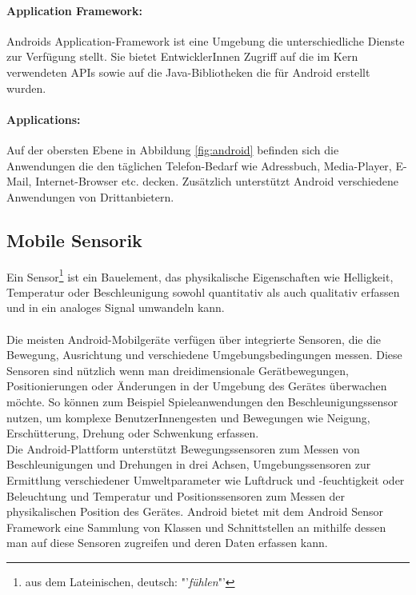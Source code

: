 \paragraph{Application Framework: }
Androids Application-Framework ist eine Umgebung die unterschiedliche Dienste zur Verfügung stellt. Sie bietet EntwicklerInnen Zugriff auf die im Kern verwendeten \glspl{API} sowie auf die Java-Bibliotheken die für Android erstellt wurden. 
\paragraph{Applications: }
Auf der obersten Ebene in Abbildung \ref{fig:android} befinden sich die Anwendungen die den täglichen Telefon-Bedarf wie Adressbuch, Media-Player, E-Mail, Internet-Browser etc. decken. Zusätzlich unterstützt Android verschiedene Anwendungen von Drittanbietern.
%
%
\subsection{Mobile Sensorik} 
Ein Sensor\footnote{ aus dem Lateinischen, deutsch: "'\textit{fühlen}"'} ist ein Bauelement, das physikalische Eigenschaften wie Helligkeit, Temperatur oder Beschleunigung sowohl quantitativ als auch qualitativ erfassen und in ein analoges Signal umwandeln kann. \cite{sensor} \\\\
Die meisten Android-Mobilgeräte verfügen über integrierte Sensoren, die die Bewegung, Ausrichtung und verschiedene Umgebungsbedingungen messen. Diese Sensoren sind nützlich wenn man dreidimensionale Gerätbewegungen, Positionierungen oder Änderungen in der Umgebung des Gerätes überwachen möchte. So können zum Beispiel Spieleanwendungen den Beschleunigungssensor nutzen, um komplexe BenutzerInnengesten und Bewegungen wie Neigung, Erschütterung, Drehung oder Schwenkung erfassen.\\
Die Android-Plattform unterstützt Bewegungssensoren zum Messen von Beschleunigungen und Drehungen in drei Achsen, Umgebungssensoren zur Ermittlung verschiedener Umweltparameter wie Luftdruck und -feuchtigkeit oder Beleuchtung und Temperatur und Positionssensoren zum Messen der physikalischen Position des Gerätes. Android bietet mit dem Android Sensor Framework eine Sammlung von Klassen und Schnittstellen an mithilfe dessen man auf diese Sensoren zugreifen und deren Daten erfassen kann. \cite{android_sensor}  
%
%
